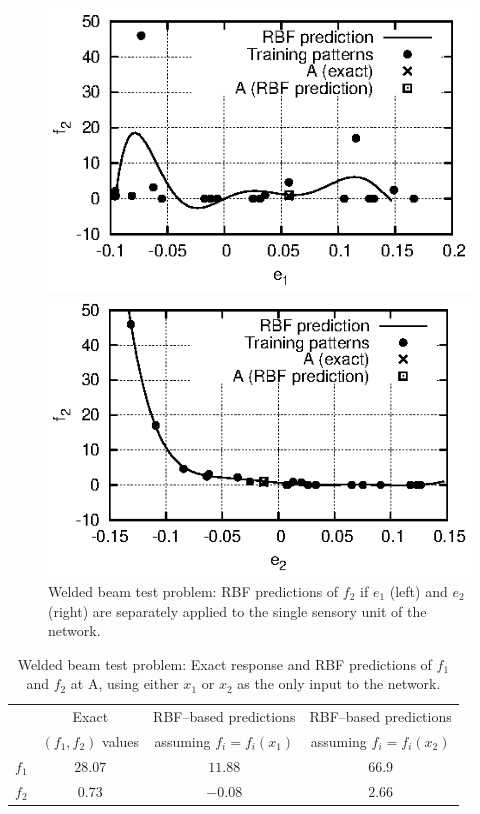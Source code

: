 \begin{figure}
\begin{minipage}{0.48\textwidth}
\includegraphics[scale=1.2]{IPE/f2_e1.eps}
\end{minipage}
\begin{minipage}{0.48\textwidth}
\includegraphics[scale=1.2]{IPE/f2_e2.eps}
\end{minipage}
\caption{Welded beam test problem: RBF predictions of $f_2$ if $e_1$ (left) and $e_2$ (right) are separately applied to the single sensory unit of the network. }
\label{fig:f2e1e2}
\end{figure}

\begin{table}[h!]
\begin{center}
\begin{tabular}{c  c | c | c}
		&      Exact  	 		&  RBF--based predictions    &  RBF--based  predictions   \\
		&  $(f_1,f_2)$ values   &  assuming $f_i=f_i(x_1)$    &   assuming $f_i=f_i(x_2)$  \\
		\hline
$f_1$	& $28.07$   &      $11.88$     &      $66.9$        \\
$f_2$	& $0.73$     &      $-0.08$     &      $2.66$        \\
\end{tabular}
\end{center}
\caption{Welded beam test problem: Exact response and RBF predictions of $f_1$ and $f_2$ at A, using either $x_1$ or $x_2$ as the only input to the network.}
\label{tab:f1f2x1x2}
\end{table}


